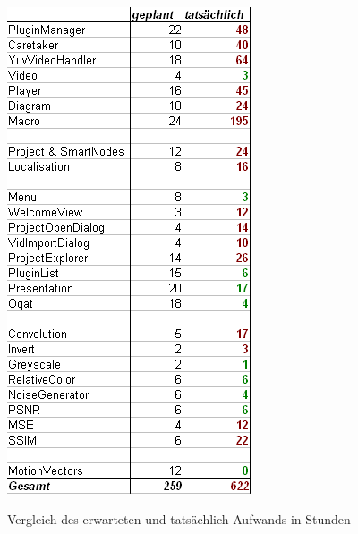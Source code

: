 \begin{figure}
\includegraphics[scale=0.55]{bilder/planung_tabelle.png}\\[5ex]
\caption{Vergleich des erwarteten und tatsächlich Aufwands in Stunden}
\end{figure}